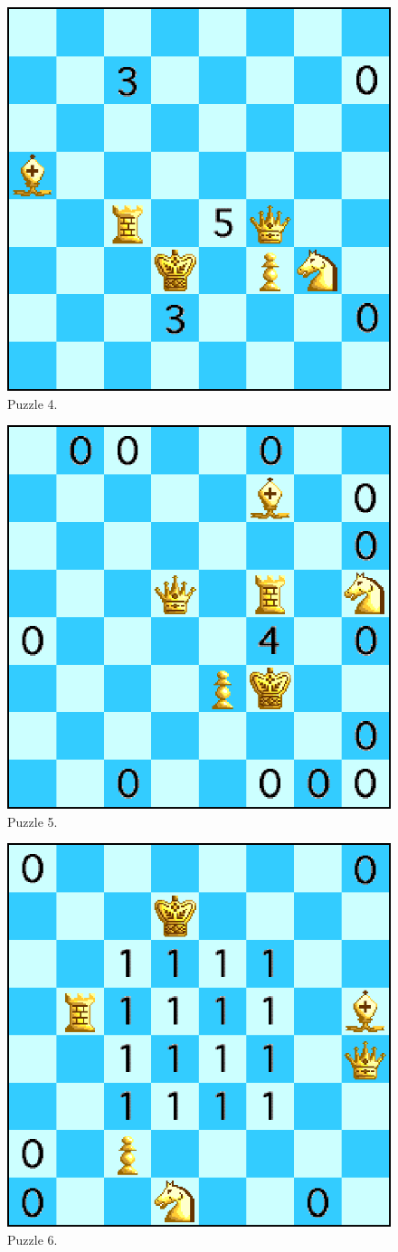 \documentclass[runningheads]{llncs}
\begin{document}
\begin{figure}[H]
  \centering
  \includegraphics[width=0.6\linewidth]{figures/chess4.eps}
  \caption{Puzzle 4.}\label{fig:puzzle4}
\end{figure}

\begin{figure}[H]
  \centering
  \includegraphics[width=0.6\linewidth]{figures/chess5.eps}
  \caption{Puzzle 5.}\label{fig:puzzle5}
\end{figure}

\begin{figure}[H]
  \centering
  \includegraphics[width=0.6\linewidth]{figures/chess6.eps}
  \caption{Puzzle 6.}\label{fig:puzzle6}
\end{figure}
\end{document}
